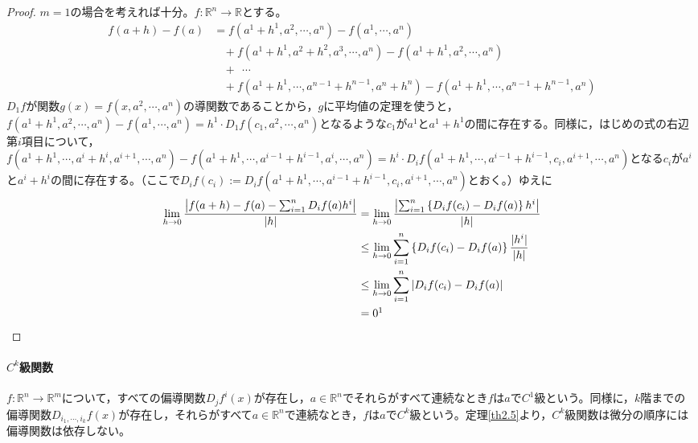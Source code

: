 \begin{proof}
	$m=1$の場合を考えれば十分\footnotemark。$f:\mathbb{R}^n\to\mathbb{R}$とする。
	\[
	\begin{split}
	f(a+h)-f(a)&=f(a^1+h^1,a^2,\cdots,a^n)-f(a^1,\cdots,a^n)\\
	&\ \ \ \ +f(a^1+h^1,a^2+h^2,a^3,\cdots,a^n)-f(a^1+h^1,a^2,\cdots,a^n)\\
	&\ \ \ \ +\ \ \cdots \\
	&\ \ \ \ +f(a^1+h^1,\cdots,a^{n-1}+h^{n-1},a^n+h^n)-f(a^1+h^1,\cdots,a^{n-1}+h^{n-1},a^n)
	\end{split}
	\]
	$D_1f$が関数$g(x)=f(x,a^2,\cdots,a^n)$の導関数であることから，$g$に平均値の定理を使うと，$f(a^1+h^1,a^2,\cdots,a^n)-f(a^1,\cdots,a^n)=h^1\cdot D_1f(c_1,a^2,\cdots,a^n)$となるような$c_1$が$a^1$と$a^1+h^1$の間に存在する。同様に，はじめの式の右辺第$i$項目について，$f(a^1+h^1,\cdots,a^i+h^i,a^{i+1},\cdots,a^n)-f(a^1+h^1,\cdots,a^{i-1}+h^{i-1},a^i,\cdots,a^n)=h^i\cdot D_if(a^1+h^1,\cdots,a^{i-1}+h^{i-1},c_i,a^{i+1},\cdots,a^n)$となる$c_i$が$a^i$と$a^i+h^i$の間に存在する。（ここで$D_if(c_i):= D_if(a^1+h^1,\cdots,a^{i-1}+h^{i-1},c_i,a^{i+1},\cdots,a^n)$とおく。）ゆえに
	\[
	\begin{split}
		\lim_{h\to0}\frac{\left|f(a+h)-f(a)-\sum_{i=1}^nD_if(a)h^i\right|}{|h|}
		&=\lim_{h\to0}\frac{\left|\sum_{i=1}^n\left\{D_if(c_i)-D_if(a)\right\}h^i\right|}{|h|}\\
		&\leq\lim_{h\to0}\sum_{i=1}^n\left\{D_if(c_i)-D_if(a)\right\}\frac{|h^i|}{|h|}\\
		&\leq\lim_{h\to0}\sum_{i=1}^n|D_if(c_i)-D_if(a)|\\
		&=0\footnotemark
	\end{split}
	\]
\end{proof}


\paragraph{$C^k$級関数}
$f:\mathbb{R}^n\to\mathbb{R}^m$について，すべての偏導関数$D_jf^i(x)$が存在し，$a\in\mathbb{R}^n$でそれらがすべて連続なとき$f$は$a$で$C^1$級という。同様に，$k$階までの　偏導関数$D_{i_1,\cdots,i_k}f(x)$が存在し，それらがすべて$a\in\mathbb{R}^n$で連続なとき，$f$は$a$で$C^k$級という。定理\ref{th2.5}より，$C^k$級関数は微分の順序には偏導関数は依存しない。

